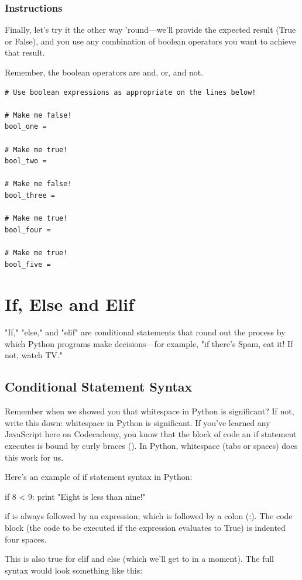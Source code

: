 \documentclass[12pt,a4paper,final,twoside,onecolumn,titlepage]{book}
\begin{document}
\subsubsection{Instructions}

Finally, let's try it the other way 'round—we'll provide the expected result (True or False), and you use any combination of boolean operators you want to achieve that result.

Remember, the boolean operators are and, or, and not.

\begin{lstlisting}
# Use boolean expressions as appropriate on the lines below!

# Make me false!
bool_one = 

# Make me true!
bool_two = 

# Make me false!
bool_three = 

# Make me true!
bool_four = 

# Make me true!
bool_five = 
\end{lstlisting}

\section{If, Else and Elif}
"If," "else," and "elif" are conditional statements that round out the process by which Python programs make decisions—for example, "if there's Spam, eat it! If not, watch TV."
    
\subsection{Conditional Statement Syntax}

Remember when we showed you that whitespace in Python is significant? If not, write this down: whitespace in Python is significant. If you've learned any JavaScript here on Codecademy, you know that the block of code an if statement executes is bound by curly braces ({}). In Python, whitespace (tabs or spaces) does this work for us.

Here's an example of if statement syntax in Python:

if 8 < 9:
    print "Eight is less than nine!"

if is always followed by an expression, which is followed by a colon (:). The code block (the code to be executed if the expression evaluates to True) is indented four spaces.

This is also true for elif and else (which we'll get to in a moment). The full syntax would look something like this:
\end{document}
